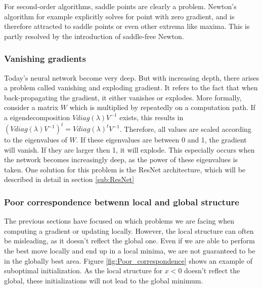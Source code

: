 For second-order algorithms, saddle points are clearly a problem. Newton's
algorithm for example explicitly solves for point with zero gradient, and is
therefore attracted to saddle points or even other extrema like maxima. This is
partly resolved by the introduction of saddle-free Newton. 


\subsubsection{Vanishing gradients}\label{sub:Vanishing_gradient} Today's neural
network become very deep. But with increasing depth, there arises a problem
called vanishing and exploding gradient. It refers to the fact that when
back-propagating the gradient, it either vanishes or explodes. More formally,
consider a matrix $W$ which is multiplied by repeatedly on a computation path.
If a eigendecomposition $Vdiag(\lambda )V^{-1}$ exists, this results in
$(Vdiag(\lambda )V^{-1})^t=Vdiag(\lambda )^tV^{-1}$. Therefore, all values are
scaled according to the eigenvalues of $W$. If these eigenvalues are between 0
and 1, the gradient will vanish. If they are larger then 1, it will explode.
This especially occurs when the network becomes increasingly deep, as the power
of these eigenvalues is taken. One solution for this problem is the ResNet
architecture, which will be described in detail in section \ref{sub:ResNet}

\subsubsection{Poor correspondence betwenn local and global
structure}\label{prob:5}

The previous sections have focused on which problems we are facing when
computing a gradient or updating locally. However, the local structure can often
be misleading, as it doesn't reflect the global one. Even if we are able to
perform the best move locally and end up in a local minima, we are not
guaranteed to be in the globally best area. Figure \ref{fig:Poor_correspondence}
shows an example of suboptimal initialization. As the local structure for $x<0$
doesn't reflect the global, these initializations will not lead to the global
minimum.

